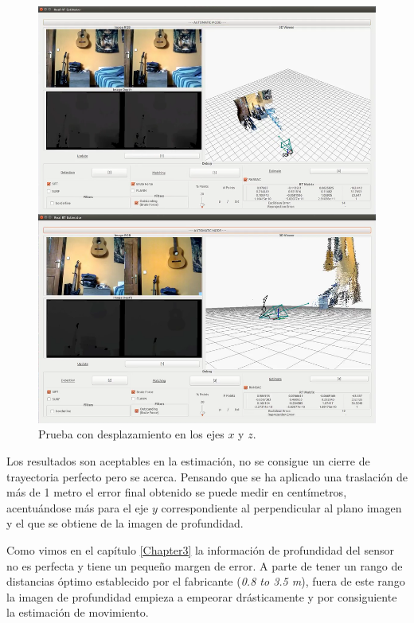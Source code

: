 \begin{figure}[th]
\centering
\includegraphics[scale=0.3]{Figures/tests/axis-x-z.png}
\decoRule
\caption[Prueba con desplazamiento en los ejes $x$ y $z$]{Prueba con desplazamiento en los ejes $x$ y $z$.}
\label{fig:axis-xz}
\end{figure}

Los resultados son aceptables en la estimación, no se consigue un cierre de trayectoria perfecto pero se acerca. Pensando que se ha aplicado una traslación de más de 1 metro el error final obtenido se puede medir en centímetros, acentuándose más para el eje $y$ correspondiente al perpendicular al plano imagen y el que se obtiene de la imagen de profundidad.

Como vimos en el capítulo \ref{Chapter3} la información de profundidad del sensor no es perfecta y tiene un pequeño margen de error. A parte de tener un rango de distancias óptimo establecido por el fabricante (\textit{0.8 to 3.5 m}), fuera de este rango la imagen de profundidad empieza a empeorar drásticamente y por consiguiente la estimación de movimiento.

